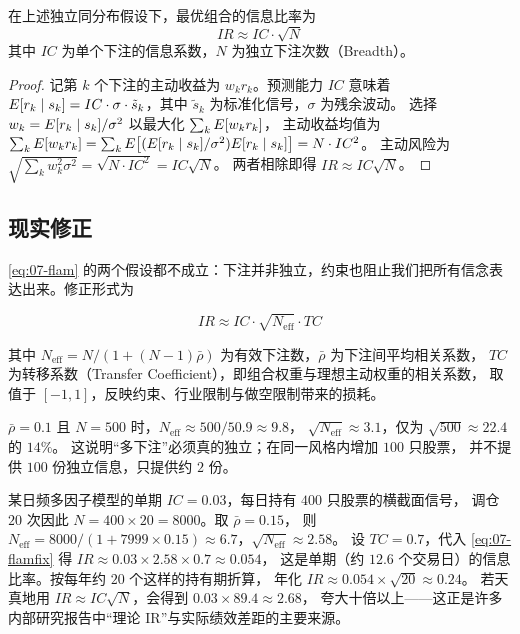 \begin{proposition}[主动管理基本定律]\label{prop:07-flam}
在上述独立同分布假设下，最优组合的信息比率为
\begin{equation}
  IR \approx IC \cdot \sqrt{N}
  \label{eq:07-flam}
\end{equation}
其中 $IC$ 为单个下注的信息系数，$N$ 为独立下注次数（Breadth）。
\end{proposition}

\begin{proof}
记第 $k$ 个下注的主动收益为 $w_k r_k$。预测能力 $IC$ 意味着
$E[r_k \mid s_k] = IC \cdot \sigma \cdot \tilde{s}_k$，其中 $\tilde{s}_k$ 为标准化信号，$\sigma$ 为残余波动。
选择 $w_k = E[r_k\mid s_k]/\sigma^2$ 以最大化 $\sum_k E[w_k r_k]$，
主动收益均值为 $\sum_k E[w_k r_k] = \sum_k E\big[(E[r_k\mid s_k]/\sigma^2)E[r_k\mid s_k]\big] = N \cdot IC^2$。
主动风险为 $\sqrt{\sum_k w_k^2 \sigma^2} = \sqrt{N \cdot IC^2} = IC\sqrt{N}$。
两者相除即得 $IR \approx IC\sqrt{N}$。
\end{proof}

\subsection{现实修正}

\cref{eq:07-flam} 的两个假设都不成立：下注并非独立，约束也阻止我们把所有信念表达出来。修正形式为

\begin{equation}
  IR \approx IC \cdot \sqrt{N_{\text{eff}}} \cdot TC
  \label{eq:07-flamfix}
\end{equation}

其中 $N_{\text{eff}} = N/(1 + (N-1)\bar{\rho})$ 为有效下注数，$\bar{\rho}$ 为下注间平均相关系数，
$TC$ 为转移系数（Transfer Coefficient），即组合权重与理想主动权重的相关系数，
取值于 $[-1,1]$，反映约束、行业限制与做空限制带来的损耗。

\begin{intuitionbox}[广度的数量级直觉]
$\bar{\rho} = 0.1$ 且 $N = 500$ 时，$N_{\text{eff}} \approx 500/50.9 \approx 9.8$，
$\sqrt{N_{\text{eff}}} \approx 3.1$，仅为 $\sqrt{500} \approx 22.4$ 的 $14\%$。
这说明“多下注”必须真的独立；在同一风格内增加 $100$ 只股票，
并不提供 $100$ 份独立信息，只提供约 $2$ 份。
\end{intuitionbox}

\begin{example}[年化 IR 的完整推算]\label{ex:07-ir}
某日频多因子模型的单期 $IC = 0.03$，每日持有 $400$ 只股票的横截面信号，
调仓 $20$ 次因此 $N = 400 \times 20 = 8000$。取 $\bar{\rho} = 0.15$，
则 $N_{\text{eff}} = 8000/(1 + 7999 \times 0.15) \approx 6.7$，$\sqrt{N_{\text{eff}}} \approx 2.58$。
设 $TC = 0.7$，代入 \cref{eq:07-flamfix} 得 $IR \approx 0.03 \times 2.58 \times 0.7 \approx 0.054$，
这是单期（约 $12.6$ 个交易日）的信息比率。按每年约 $20$ 个这样的持有期折算，
年化 $IR \approx 0.054 \times \sqrt{20} \approx 0.24$。
若天真地用 $IR \approx IC\sqrt{N}$，会得到 $0.03 \times 89.4 \approx 2.68$，
夸大十倍以上——这正是许多内部研究报告中“理论 IR”与实际绩效差距的主要来源。
\end{example}

